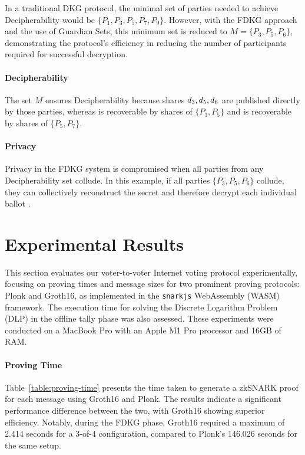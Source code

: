 \documentclass[runningheads]{llncs}
\begin{document}
In a traditional DKG protocol, the minimal set of parties needed to achieve Decipherability would be \(\{P_1, P_3, P_5, P_7, P_9 \}\). However, with the FDKG approach and the use of Guardian Sets, this minimum set is reduced to \(M = \{P_3, P_5, P_6\}\), demonstrating the protocol's efficiency in reducing the number of participants required for successful decryption.

\paragraph{Decipherability}
The set $M$ ensures Decipherability because shares $d_{3},d_{5},d_{6}$ are published directly by those parties, whereas  is recoverable by shares of \(\{P_3, P_5\}\) and  is recoverable by shares of \(\{P_5, P_7\}\).

\paragraph{Privacy}
Privacy in the FDKG system is compromised when all parties from any Decipherability set collude. In this example, if all parties \(\{P_3, P_5, P_6\}\) collude, they can collectively reconstruct the secret \DecryptionKey{} and therefore decrypt each individual ballot .


\section{Experimental Results}

This section evaluates our voter-to-voter Internet voting protocol experimentally, focusing on proving times and message sizes for two prominent proving protocols: Plonk and Groth16, as implemented in the \texttt{snarkjs} WebAssembly (WASM) framework. The execution time for solving the Discrete Logarithm Problem (DLP) in the offline tally phase was also assessed. These experiments were conducted on a MacBook Pro with an Apple M1 Pro processor and 16GB of RAM.

\paragraph{Proving Time}

Table~\ref{table:proving-time} presents the time taken to generate a zkSNARK proof for each message using Groth16 and Plonk. The results indicate a significant performance difference between the two, with Groth16 showing superior efficiency. Notably, during the FDKG phase, Groth16 required a maximum of 2.414 seconds for a 3-of-4 configuration, compared to Plonk's 146.026 seconds for the same setup.
\end{document}
